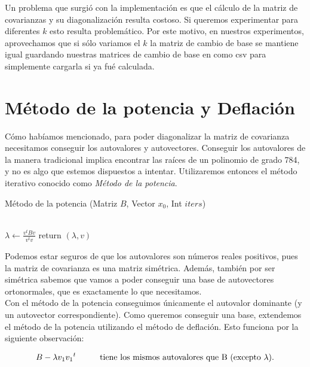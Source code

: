Un problema que surgió con la implementación es que el cálculo de la matriz de covarianzas y su diagonalización resulta costoso. Si queremos experimentar para diferentes $k$ esto resulta problemático. Por este motivo, en nuestros experimentos, aprovechamos que si sólo variamos el $k$ la matriz de cambio de base se mantiene igual guardando nuestras matrices de cambio de base en como csv para simplemente cargarla si ya fué calculada. \\

\newpage
\section{Método de la potencia y Deflación}

Cómo habíamos mencionado, para poder diagonalizar la matriz de covarianza necesitamos conseguir los autovalores y autovectores. Conseguir los autovalores de la manera tradicional implica encontrar las raíces de un polinomio de grado 784, y no es algo que estemos dispuestos a intentar. Utilizaremos entonces el método iterativo conocido como \textit{Método de la potencia}.
\begin{algorithm}
    \caption{Método de la potencia (Matriz $B$, Vector $x_0$, Int $iters$)}
    \begin{algorithmic}[h]
             \\
        \EndFor
        \State  $\lambda \gets \frac{v^tBv}{v^tv}$
        \State return $(\lambda, v)$

    \end{algorithmic}
\end{algorithm}

Podemos estar seguros de que los autovalores son números reales positivos, pues la matriz de covarianza es una matriz simétrica. Además, también por ser simétrica sabemos que vamos a poder conseguir una base de autovectores ortonormales, que es exactamente lo que necesitamos. \\

Con el método de la potencia conseguimos únicamente el autovalor dominante (y un autovector correspondiente). Como queremos conseguir una base, extendemos el método de la potencia utilizando el método de deflación. Esto funciona por la siguiente observación:

$$ B - \lambda v_1 {v_1}^{t} \text{\hspace{1cm}tiene los mismos autovalores que B (excepto $\lambda$).} $$

